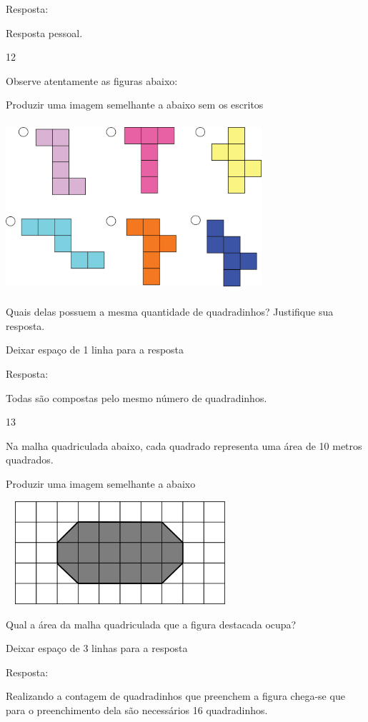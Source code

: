 Resposta:

Resposta pessoal.

\num{12}

Observe atentamente as figuras abaixo:

Produzir uma imagem semelhante a abaixo sem os escritos

\includegraphics[width=3.72532in,height=2.47521in]{media/image59.png}

Quais delas possuem a mesma quantidade de quadradinhos? Justifique sua
resposta.

Deixar espaço de 1 linha para a resposta

Resposta:

Todas são compostas pelo mesmo número de quadradinhos.

\num{13}

Na malha quadriculada abaixo, cada quadrado representa uma área de 10
metros quadrados.

Produzir uma imagem semelhante a abaixo

\includegraphics[width=3.33333in,height=1.50517in]{media/image60.png}

Qual a área da malha quadriculada que a figura destacada ocupa?

Deixar espaço de 3 linhas para a resposta

Resposta:

Realizando a contagem de quadradinhos que preenchem a figura chega-se
que para o preenchimento dela são necessários 16 quadradinhos.

